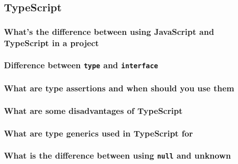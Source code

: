 \documentclass[12pt, a4paper]{article}
\newcommand{\code}[1]{\texttt{#1}}
\begin{document}
\pagebreak

\subsection*{TypeScript}
\subsubsection*{What's the difference between using JavaScript and TypeScript in a project}

\subsubsection*{Difference between \code{type} and \code{interface}}

\subsubsection*{What are type assertions and when should you use them}

\subsubsection*{What are some disadvantages of TypeScript}

\subsubsection*{What are type generics used in TypeScript for}

\subsubsection*{What is the difference between using \code{null} and {unknown}}
\end{document}
